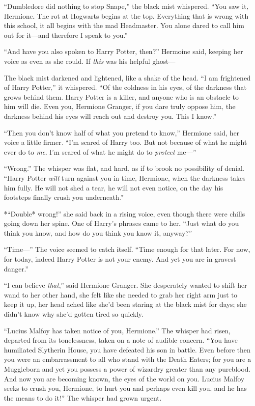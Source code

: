 ``Dumbledore did nothing to stop Snape,'' the black mist whispered.
``You saw it, Hermione. The rot at Hogwarts begins at the top.
Everything that is wrong with this school, it all begins with the mad
Headmaster. You alone dared to call him out for it---and therefore I
speak to you.''

``And have you also spoken to Harry Potter, then?'' Hermoine said,
keeping her voice as even as she could. If \emph{this} was his helpful
ghost---

The black mist darkened and lightened, like a shake of the head. ``I am
frightened of Harry Potter,'' it whispered. ``Of the coldness in his
eyes, of the darkness that grows behind them. Harry Potter is a killer,
and anyone who is an obstacle to him will die. Even you, Hermione
Granger, if you dare truly oppose him, the darkness behind his eyes will
reach out and destroy you. This I know.''

``Then you don't know half of what you pretend to know,'' Hermione said,
her voice a little firmer. ``I'm scared of Harry too. But not because of
what he might ever do to \emph{me}. I'm scared of what he might do to
\emph{protect} me---''

``Wrong.'' The whisper was flat, and hard, as if to brook no possibility
of denial. ``Harry Potter \emph{will} turn against you in time,
Hermione, when the darkness takes him fully. He will not shed a tear, he
will not even notice, on the day his footsteps finally crush you
underneath.''

*``Double* wrong!'' she said back in a rising voice, even though there
were chills going down her spine. One of Harry's phrases came to her.
``Just what do you think you know, and how do you think you know it,
anyway?''

``Time---'' The voice seemed to catch itself. ``Time enough for that
later. For now, for today, indeed Harry Potter is not your enemy. And
yet you are in gravest danger.''

``I can believe \emph{that},'' said Hermione Granger. She desperately
wanted to shift her wand to her other hand, she felt like she needed to
grab her right arm just to keep it up, her head ached like she'd been
staring at the black mist for days; she didn't know why she'd gotten
tired so quickly.

``Lucius Malfoy has taken notice of you, Hermione.'' The whisper had
risen, departed from its tonelessness, taken on a note of audible
concern. ``You have humiliated Slytherin House, you have defeated his
son in battle. Even before then you were an embarrassment to all who
stand with the Death Eaters; for you are a Muggleborn and yet you
possess a power of wizardry greater than any pureblood. And now you are
becoming known, the eyes of the world on you. Lucius Malfoy seeks to
crush you, Hermione, to hurt you and perhaps even kill you, and he has
the means to do it!'' The whisper had grown urgent.

